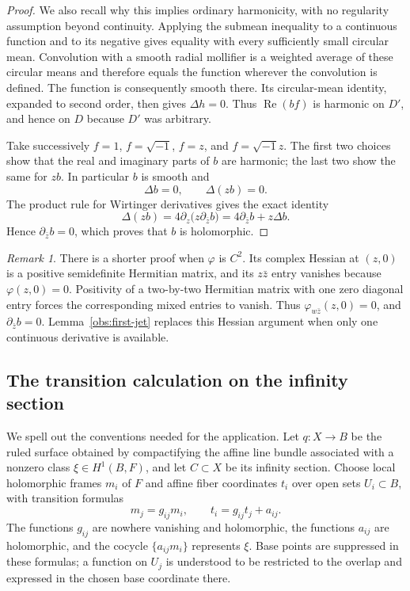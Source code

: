 \documentclass[11pt,a4paper]{article}
\numberwithin{equation}{section}
\theoremstyle{definition}
\theoremstyle{remark}
\newtheorem{remark}[theorem]{Remark}
\begin{document}
\begin{proof}
We also recall why this implies ordinary harmonicity, with no regularity
assumption beyond continuity.  Applying the submean inequality to a
continuous function and to its negative gives equality with every
sufficiently small circular mean.  Convolution with a smooth radial
mollifier is a weighted average of these circular means and therefore
equals the function wherever the convolution is defined.  The function
is consequently smooth there.  Its circular-mean identity, expanded to
second order, then gives $\Delta h=0$.  Thus
$\operatorname{Re}(bf)$ is harmonic on $D'$, and hence on $D$ because
$D'$ was arbitrary.

Take successively $f=1$, $f=\sqrt{-1}$, $f=z$, and
$f=\sqrt{-1}z$.  The first two choices show that the real and imaginary
parts of $b$ are harmonic; the last two show the same for $zb$.  In
particular $b$ is smooth and
\[
                    \Delta b=0,\qquad \Delta(zb)=0.
\]
The product rule for Wirtinger derivatives gives the exact identity
\[
   \Delta(zb)
     =4\partial_z\bigl(z\partial_{\bar z}b\bigr)
     =4\partial_{\bar z}b+z\Delta b.
\]
Hence $\partial_{\bar z}b=0$, which proves that $b$ is holomorphic.
\end{proof}

\begin{remark}
\label{obs:c2-comparison}
There is a shorter proof when $\varphi$ is $C^2$.  Its complex Hessian at
$(z,0)$ is a positive semidefinite Hermitian matrix, and its
$z\bar z$ entry vanishes because $\varphi(z,0)=0$.  Positivity of a
two-by-two Hermitian matrix with one zero diagonal entry forces the
corresponding mixed entries to vanish.  Thus
$\varphi_{w\bar z}(z,0)=0$, and
$\partial_{\bar z}b=0$.  Lemma~\ref{obs:first-jet} replaces this Hessian
argument when only one continuous derivative is available.
\end{remark}

\subsection{The transition calculation on the infinity section}

We spell out the conventions needed for the application.  Let
$q:X\longrightarrow B$ be the ruled surface obtained by compactifying the
affine line bundle associated with a nonzero class
$\xi\in H^1(B,F)$, and let $C\subset X$ be its infinity section.  Choose
local holomorphic frames $m_i$ of $F$ and affine fiber coordinates $t_i$
over open sets $U_i\subset B$, with transition formulas
\begin{equation}
\label{obs:affine-transitions}
       m_j=g_{ij}m_i,
       \qquad t_i=g_{ij}t_j+a_{ij}.
\end{equation}
The functions $g_{ij}$ are nowhere vanishing and holomorphic, the
functions $a_{ij}$ are holomorphic, and the cocycle
$\{a_{ij}m_i\}$ represents $\xi$.  Base points are suppressed in these
formulas; a function on $U_j$ is understood to be restricted to the
overlap and expressed in the chosen base coordinate there.
\end{document}
